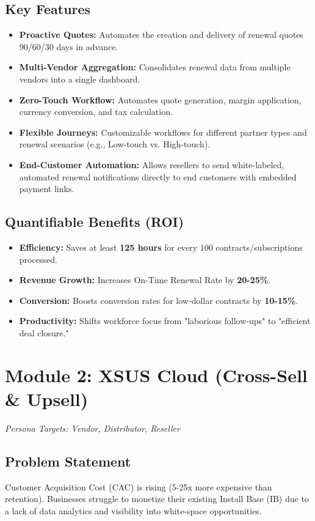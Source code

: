 \documentclass[12pt,a4paper]{article}
\begin{document}
\subsection{Key Features}
\begin{itemize}
    \item \textbf{Proactive Quotes:} Automates the creation and delivery of renewal quotes 90/60/30 days in advance.
    \item \textbf{Multi-Vendor Aggregation:} Consolidates renewal data from multiple vendors into a single dashboard.
    \item \textbf{Zero-Touch Workflow:} Automates quote generation, margin application, currency conversion, and tax calculation.
    \item \textbf{Flexible Journeys:} Customizable workflows for different partner types and renewal scenarios (e.g., Low-touch vs. High-touch).
    \item \textbf{End-Customer Automation:} Allows resellers to send white-labeled, automated renewal notifications directly to end customers with embedded payment links.
\end{itemize}

\subsection{Quantifiable Benefits (ROI)}
\begin{itemize}
    \item \textbf{Efficiency:} Saves at least \textbf{125 hours} for every 100 contracts/subscriptions processed.
    \item \textbf{Revenue Growth:} Increases On-Time Renewal Rate by \textbf{20-25\%}.
    \item \textbf{Conversion:} Boosts conversion rates for low-dollar contracts by \textbf{10-15\%}.
    \item \textbf{Productivity:} Shifts workforce focus from "laborious follow-ups" to "efficient deal closure."
\end{itemize}

\section{Module 2: XSUS Cloud (Cross-Sell \& Upsell)}
\textit{Persona Targets: Vendor, Distributor, Reseller}

\subsection{Problem Statement}
Customer Acquisition Cost (CAC) is rising (5-25x more expensive than retention). Businesses struggle to monetize their existing Install Base (IB) due to a lack of data analytics and visibility into white-space opportunities.
\end{document}
